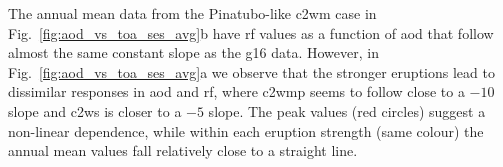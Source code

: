 \documentclass{ametsocV6.1}
\begin{document}
The annual mean data from the Pinatubo-like \gls{c2wm} case in
Fig.~\ref{fig:aod_vs_toa_ses_avg}b have \gls{rf} values as a function of \gls{aod} that
follow almost the same constant slope as the \gls{g16} data. However, in
Fig.~\ref{fig:aod_vs_toa_ses_avg}a we observe that the stronger eruptions lead to
dissimilar responses in \gls{aod} and \gls{rf}, where \gls{c2wmp}
seems to follow close to a \(-10\) slope and \gls{c2ws} is closer to a
\(-5\) slope. The peak values (red circles) suggest a non-linear dependence, while
within each eruption strength (same colour) the annual mean values fall relatively close
to a straight line.
\end{document}
